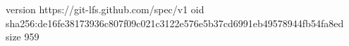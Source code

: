 version https://git-lfs.github.com/spec/v1
oid sha256:de16fe38173936c807f09c021c3122e576e5b37cd6991eb49578944fb54fa8ed
size 959
